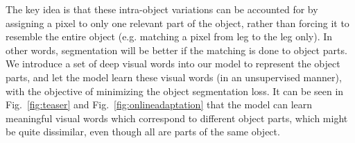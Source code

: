 \documentclass[10pt,twocolumn,letterpaper]{article}
\begin{document}
The key idea is that these intra-object variations can be accounted for by assigning a pixel to only one relevant part of the object, rather than forcing it to resemble the entire object (e.g. matching a pixel from leg to the leg only). In other words, segmentation will be better if the matching is done to object parts.
We introduce a set of deep visual words into our model to represent the object parts, and let the model learn these visual words (in an unsupervised manner), with the objective of minimizing the object segmentation loss.
It can be seen in Fig.~\ref{fig:teaser} and Fig.~\ref{fig:onlineadaptation} that the model can learn meaningful visual words which correspond to different object parts, which might be quite dissimilar, even though all are parts of the same object. %
\end{document}
